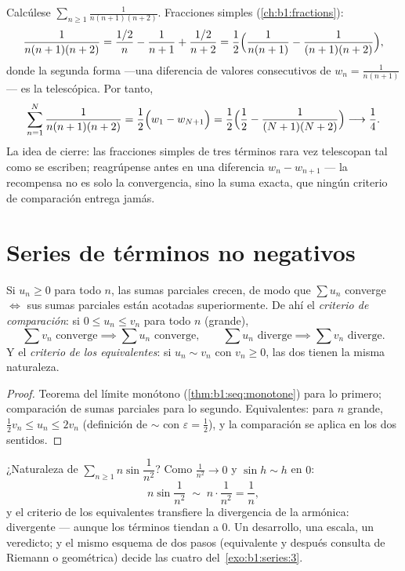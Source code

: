 \begin{example}\label{ex:b1:series:telescope3}
Calcúlese $\sum_{n\geq1} \frac{1}{n(n+1)(n+2)}$. Fracciones simples
(\cref{ch:b1:fractions}):
\[
\frac{1}{n(n+1)(n+2)}
= \frac{1/2}{n} - \frac{1}{n+1} + \frac{1/2}{n+2}
= \frac12\Bigl(\frac{1}{n(n+1)} - \frac{1}{(n+1)(n+2)}\Bigr),
\]
donde la segunda forma ---una diferencia de valores consecutivos de
$w_n = \frac{1}{n(n+1)}$--- es la telescópica. Por tanto,
\[
\sum_{n=1}^{N} \frac{1}{n(n+1)(n+2)}
= \frac12\Bigl(w_1 - w_{N+1}\Bigr)
= \frac12\Bigl(\frac12 - \frac{1}{(N+1)(N+2)}\Bigr)
\longrightarrow \frac14 .
\]
La idea de cierre: las fracciones simples de tres términos rara vez
telescopan tal como se escriben; reagrúpense antes en una diferencia
$w_n - w_{n+1}$ --- la recompensa no es solo la convergencia, sino la
suma exacta, que ningún criterio de comparación entrega jamás.
\end{example}

\section{Series de términos no negativos}

\begin{theorem}\label{thm:b1:series:positive}
Si $u_n \geq 0$ para todo $n$, las sumas parciales crecen, de modo
que $\sum u_n$ converge $\iff$ sus sumas parciales están acotadas
superiormente. De ahí el \emph{criterio de comparación}: si
$0 \leq u_n \leq v_n$ para todo $n$ (grande),
\[
\sum v_n \text{ converge} \implies \sum u_n \text{ converge},
\qquad
\sum u_n \text{ diverge} \implies \sum v_n \text{ diverge}.
\]
Y el \emph{criterio de los equivalentes}: si $u_n \sim v_n$ con
$v_n \geq 0$, las dos  tienen la misma naturaleza.
\end{theorem}

\begin{proof}
Teorema del límite monótono (\cref{thm:b1:seq:monotone}) para lo
primero; comparación de sumas parciales para lo segundo.
Equivalentes: para $n$ grande, $\frac12 v_n \leq u_n \leq 2 v_n$
(definición de $\sim$ con $\varepsilon = \frac12$), y la comparación
se aplica en los dos sentidos.
\end{proof}

\begin{example}\label{ex:b1:series:equivdiverge}
¿Naturaleza de $\sum_{n\geq1} n\sin\dfrac{1}{n^2}$? Como
$\frac{1}{n^2} \to 0$ y $\sin h \sim h$ en $0$:
\[
n\sin\frac{1}{n^2} \;\sim\; n\cdot\frac{1}{n^2} = \frac1n ,
\]
y el criterio de los equivalentes transfiere la divergencia de la
 armónica: divergente --- aunque los términos tiendan a $0$.
Un desarrollo, una escala, un veredicto; y el mismo esquema de dos
pasos (equivalente y después consulta de Riemann o geométrica) decide
las cuatro  del~\cref{exo:b1:series:3}.
\end{example}

